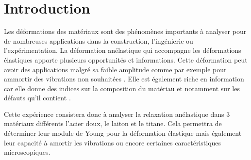 \section{Introduction}
Les déformations des matériaux sont des phénomènes importants à analyser pour de nombreuses applications dans la construction, l'ingénierie ou l'expérimentation. La déformation anélastique qui accompagne les déformations élastiques apporte plusieurs opportunités et informations. Cette déformation peut avoir des applications malgré sa faible amplitude comme par exemple pour ammortir des vibrations non souhaitées \cite{damp-damp}. Elle est également riche en information car elle donne des indices sur la composition du matériau et notamment sur les défauts qu'il contient \cite{notice}.

Cette expérience consistera donc à analyser la relaxation anélastique dans 3 matériaux différents l'acier doux, le laiton et le titane. Cela permettra de déterminer leur module de Young pour la déformation élastique mais également leur capacité à amortir les vibrations ou encore certaines caractéristiques microscopiques.